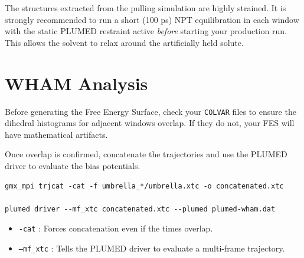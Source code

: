 \documentclass[12pt, a4paper]{article}
\begin{document}
\begin{protip}
The structures extracted from the pulling simulation are highly strained. It is strongly recommended to run a short (100 ps) NPT equilibration in each window with the static PLUMED restraint active \textit{before} starting your production run. This allows the solvent to relax around the artificially held solute.
\end{protip}

\section{WHAM Analysis}
Before generating the Free Energy Surface, check your \texttt{COLVAR} files to ensure the dihedral histograms for adjacent windows overlap. If they do not, your FES will have mathematical artifacts.

Once overlap is confirmed, concatenate the trajectories and use the PLUMED driver to evaluate the bias potentials.

\begin{lstlisting}[title={\textbf{Bash Execution}}]
gmx_mpi trjcat -cat -f umbrella_*/umbrella.xtc -o concatenated.xtc

plumed driver --mf_xtc concatenated.xtc --plumed plumed-wham.dat
\end{lstlisting}

\begin{syntaxbox}
\begin{itemize}
    \item \texttt{-cat} : Forces concatenation even if the times overlap.
    \item \texttt{--mf\_xtc} : Tells the PLUMED driver to evaluate a multi-frame trajectory.
\end{itemize}
\end{syntaxbox}
\end{document}
